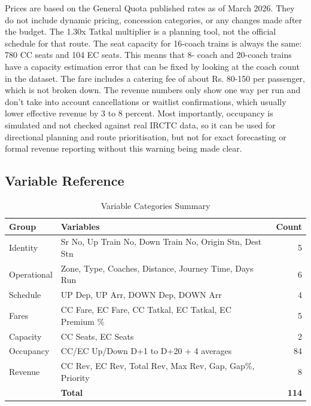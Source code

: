 \documentclass[10pt,a4paper]{article}
\begin{document}
Prices are based on the General Quota published rates as of March 2026. They do not include
dynamic pricing, concession categories, or any changes made after the budget. The 1.30x
Tatkal multiplier is a planning tool, not the official schedule for that route. The seat capacity
for 16-coach trains is always the same: 780 CC seats and 104 EC seats. This means that 8-
coach and 20-coach trains have a capacity estimation error that can be fixed by looking at the
coach count in the dataset. The fare includes a catering fee of about Rs. 80-150 per passenger,
which is not broken down. The revenue numbers only show one way per run and don't take
into account cancellations or waitlist confirmations, which usually lower effective revenue by
3 to 8 percent. Most importantly, occupancy is simulated and not checked against real IRCTC
data, so it can be used for directional planning and route prioritisation, but not for exact
forecasting or formal revenue reporting without this warning being made clear.

\subsection{Variable Reference}
\begin{table}[h!]
\centering
\tiny
\caption{Variable Categories Summary}
\begin{tabular}{p{1.4cm}p{5.2cm}r}
\toprule
\textbf{Group} & \textbf{Variables} & \textbf{Count} \\
\midrule
Identity & Sr No, Up Train No, Down Train No, Origin Stn, Dest Stn & 5 \\
Operational & Zone, Type, Coaches, Distance, Journey Time, Days Run & 6 \\
Schedule & UP Dep, UP Arr, DOWN Dep, DOWN Arr & 4 \\
Fares & CC Fare, EC Fare, CC Tatkal, EC Tatkal, EC Premium \% & 5 \\
Capacity & CC Seats, EC Seats & 2 \\
Occupancy & CC/EC Up/Down D+1 to D+20 + 4 averages & 84 \\
Revenue & CC Rev, EC Rev, Total Rev, Max Rev, Gap, Gap\%, Priority & 8 \\
\midrule
 & \textbf{Total} & \textbf{114} \\
\bottomrule
\end{tabular}
\end{table}



\end{document}
